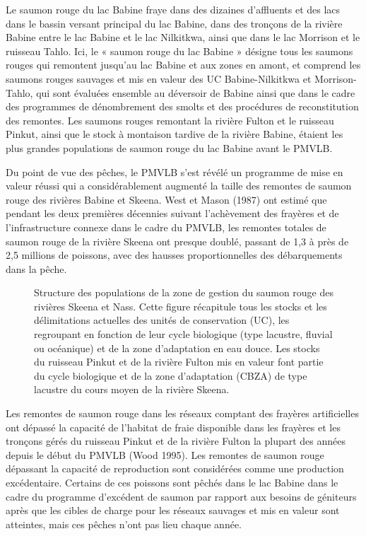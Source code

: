 \documentclass[french,11pt]{book}
\begin{document}
Le saumon rouge du lac Babine fraye dans des dizaines d'affluents et des lacs dans le bassin versant principal du lac Babine, dans des tronçons de la rivière Babine entre le lac Babine et le lac Nilkitkwa, ainsi que dans le lac Morrison et le ruisseau Tahlo. Ici, le « saumon rouge du lac Babine » désigne tous les saumons rouges qui remontent jusqu'au lac Babine et aux zones en amont, et comprend les saumons rouges sauvages et mis en valeur des UC Babine-Nilkitkwa et Morrison-Tahlo, qui sont évaluées ensemble au déversoir de Babine ainsi que dans le cadre des programmes de dénombrement des smolts et des procédures de reconstitution des remontes. Les saumons rouges remontant la rivière Fulton et le ruisseau Pinkut, ainsi que le stock à montaison tardive de la rivière Babine, étaient les plus grandes populations de saumon rouge du lac Babine avant le PMVLB.

Du point de vue des pêches, le PMVLB s'est révélé un programme de mise en valeur réussi qui a considérablement augmenté la taille des remontes de saumon rouge des rivières Babine et Skeena. West et Mason (1987) ont estimé que pendant les deux premières décennies suivant l'achèvement des frayères et de l'infrastructure connexe dans le cadre du PMVLB, les remontes totales de saumon rouge de la rivière Skeena ont presque doublé, passant de 1,3 à près de 2,5 millions de poissons, avec des hausses proportionnelles des débarquements dans la pêche.


\begin{figure}[H]

{\centering {} 

}

\caption{Structure des populations de la zone de gestion du saumon rouge des rivières Skeena et Nass. Cette figure récapitule tous les stocks et les délimitations actuelles des unités de conservation (UC), les regroupant en fonction de leur cycle biologique (type lacustre, fluvial ou océanique) et de la zone d'adaptation en eau douce. Les stocks du ruisseau Pinkut et de la rivière Fulton mis en valeur font partie du cycle biologique et de la zone d'adaptation (CBZA) de type lacustre du cours moyen de la rivière Skeena.}\label{fig:PopStrucGeneral}
\end{figure}
Les remontes de saumon rouge dans les réseaux comptant des frayères artificielles ont dépassé la capacité de l'habitat de fraie disponible dans les frayères et les tronçons gérés du ruisseau Pinkut et de la rivière Fulton la plupart des années depuis le début du PMVLB (Wood 1995). Les remontes de saumon rouge dépassant la capacité de reproduction sont considérées comme une production excédentaire. Certains de ces poissons sont pêchés dans le lac Babine dans le cadre du programme d'excédent de saumon par rapport aux besoins de géniteurs après que les cibles de charge pour les réseaux sauvages et mis en valeur sont atteintes, mais ces pêches n'ont pas lieu chaque année.
\end{document}
